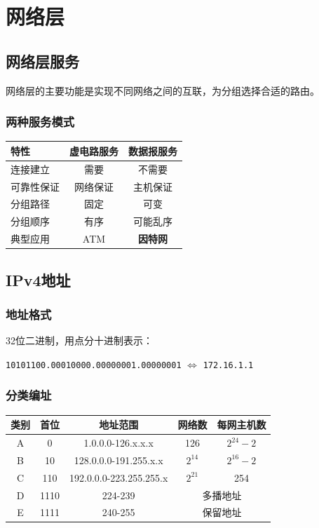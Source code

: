 \chapter{网络层}
\section{网络层服务}
网络层的主要功能是实现不同网络之间的互联，为分组选择合适的路由。

\subsection{两种服务模式}
\begin{table}[htbp]
\centering\small
\begin{tabular}{lcc}
\toprule
\textbf{特性} & \textbf{虚电路服务} & \textbf{数据报服务} \\
\midrule
连接建立 & 需要 & 不需要 \\
可靠性保证 & 网络保证 & 主机保证 \\
分组路径 & 固定 & 可变 \\
分组顺序 & 有序 & 可能乱序 \\
典型应用 & ATM & \textbf{因特网} \\
\bottomrule
\end{tabular}
\end{table}

\section{IPv4地址}
\subsection{地址格式}
32位二进制，用点分十进制表示：
\begin{center}
\texttt{10101100.00010000.00000001.00000001} $\Leftrightarrow$ \texttt{172.16.1.1}
\end{center}

\subsection{分类编址}
\begin{table}[htbp]
\centering\small
\begin{tabular}{ccccc}
\toprule
\textbf{类别} & \textbf{首位} & \textbf{地址范围} & \textbf{网络数} & \textbf{每网主机数} \\
\midrule
A & 0 & 1.0.0.0-126.x.x.x & 126 & $2^{24}-2$ \\
B & 10 & 128.0.0.0-191.255.x.x & $2^{14}$ & $2^{16}-2$ \\
C & 110 & 192.0.0.0-223.255.255.x & $2^{21}$ & 254 \\
D & 1110 & 224-239 & \multicolumn{2}{c}{多播地址} \\
E & 1111 & 240-255 & \multicolumn{2}{c}{保留地址} \\
\bottomrule
\end{tabular}
\end{table}

